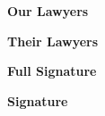 \documentclass[sign]{lawdoc}
\begin{document}
  \maketitlepage

  \makefullcaption

  \makecaption

  \begin{center}
    \textbf{Our Lawyers}
  \end{center}
  \makeourlawyersblock

  \begin{center}
    \textbf{Their Lawyers}
  \end{center}
  \maketheirlawyersblock

  \begin{center}
    \textbf{Full Signature}
  \end{center}
  \makefullsignature

  \begin{center}
    \textbf{Signature}
  \end{center}
  \makesignature

  \makecertificateofservice
\end{document}
